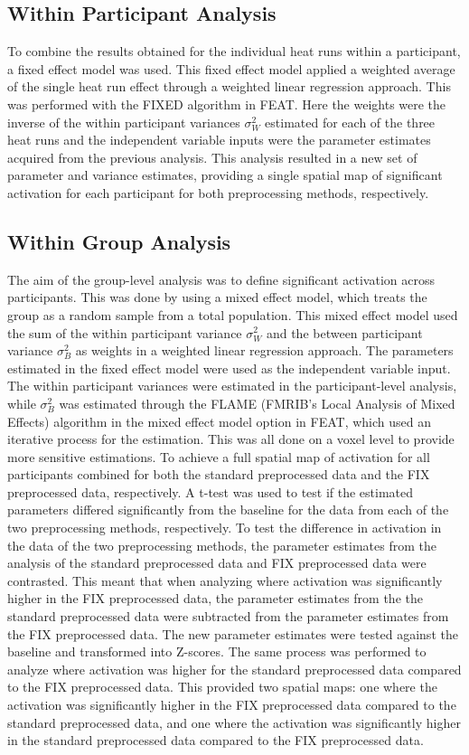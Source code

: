 \subsection{Within Participant Analysis}
To combine the results obtained for the individual heat runs within a participant, a fixed effect model was used. This fixed effect model applied a weighted average of the single heat run effect through a weighted linear regression approach. This was performed with the FIXED algorithm in FEAT. Here the weights were the inverse of the within participant variances $\sigma_{W}^{2}$ estimated for each of the three heat runs and the independent variable inputs were the parameter estimates acquired from the previous analysis. This analysis resulted in a new set of parameter and variance estimates, providing a single spatial map of significant activation for each participant for both preprocessing methods, respectively.

\subsection{Within Group Analysis}
The aim of the group-level analysis was to define significant activation across participants. This was done by using a mixed effect model, which treats the group as a random sample from a total population. This mixed effect model used the sum of the within participant variance $\sigma_{W}^{2}$ and the between participant variance $\sigma_{B}^{2}$ as weights in a weighted linear regression approach. The parameters estimated in the fixed effect model were used as the independent variable input. The within participant variances were estimated in the participant-level analysis, while $\sigma_{B}^{2}$ was estimated through the FLAME (FMRIB's Local Analysis of Mixed Effects) algorithm in the mixed effect model option in FEAT, which used an iterative process for the estimation. This was all done on a voxel level to provide more sensitive estimations.
To achieve a full spatial map of activation for all participants combined for both the standard preprocessed data and the FIX preprocessed data, respectively. A t-test was used to test if the estimated parameters differed significantly from the baseline for the data from each of the two preprocessing methods, respectively. 
To test the difference in activation in the data of the two preprocessing methods, the parameter estimates from the analysis of the standard preprocessed data and FIX preprocessed data were contrasted. This meant that when analyzing where activation was significantly higher in the FIX preprocessed data, the parameter estimates from the the standard preprocessed data were subtracted from the parameter estimates from the FIX preprocessed data. The new parameter estimates were tested against the baseline and transformed into Z-scores. The same process was performed to analyze where activation was higher for the standard preprocessed data compared to the FIX preprocessed data. This provided two spatial maps: one where the activation was significantly higher in the FIX preprocessed data compared to the standard preprocessed data, and one where the activation was significantly higher in the standard preprocessed data compared to the FIX preprocessed data.

